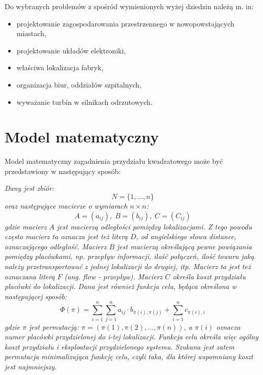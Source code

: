 Do wybranych problemów z spośród wymienionych wyżej dziedzin należą m. in:
\begin{itemize}
\item projektowanie zagospodarowania przestrzennego w nowopowstających miastach,
\item projektowanie układów elektroniki,
\item właściwa lokalizacja fabryk,
\item organizacja biur, oddziałów szpitalnych,
\item wyważanie turbin w silnikach odrzutowych.   
\end{itemize}

\section{Model matematyczny}
\label{sec:model}
Model matematyczny zagadnienia przydziału kwadratowego może być przedstawiony w następujący sposób:

\textit{Dany jest zbiór:}
\newline
\begin{equation}
N=\{1,...,n\}
\end{equation}
\newline
\textit{oraz następujące macierze o wymiarach $n\times n$:}
\newline
\begin{equation}
A=(a_{ij}),\; B=(b_{ij}),\; C=(C_{ij})
\end{equation}
\newline
\textit{gdzie macierz $A$ jest macierzą odległości pomiędzy lokalizacjami. Z tego powodu często macierz ta oznacza jest też literą $D$, od angielskiego słowa distance, oznaczającego odległość. Macierz $B$ jest macierzą określającą pewne powiązania pomiędzy placówkami, np. przepływ informacji, ilość połączeń, ilość towaru jaką należy przetransportować z jednej lokalizacji do drugiej, itp. Macierz ta jest też oznaczana literą $F$ (ang. flow - przepływ). Macierz $C$ określa  koszt przydziału  placówki do lokalizacji.
Dana jest również funkcja celu, będąca określona w następującej sposób:}
\newline
\begin{equation}
\Phi(\pi)=\sum_{i=1}^n\sum_{j=1}^n a_{ij}\cdot b_{\pi(i),\pi(j)} + \sum_{i=1}^n c_{\pi(i),i}
\end{equation}
\newline
\textit{gdzie $\pi$ jest permutacją: $\pi=(\pi(1),\pi(2),...,\pi(n))$, a $\pi(i)$ oznacza numer placówki przydzielonej do {i-tej} lokalizacji. Funkcja celu określa więc ogólny koszt przydziału i eksploatacji przydzielonego systemu. Szukana jest zatem permutacja minimalizująca funkcję celu, czyli taka, dla której wspomniany koszt jest najmniejszy.}


